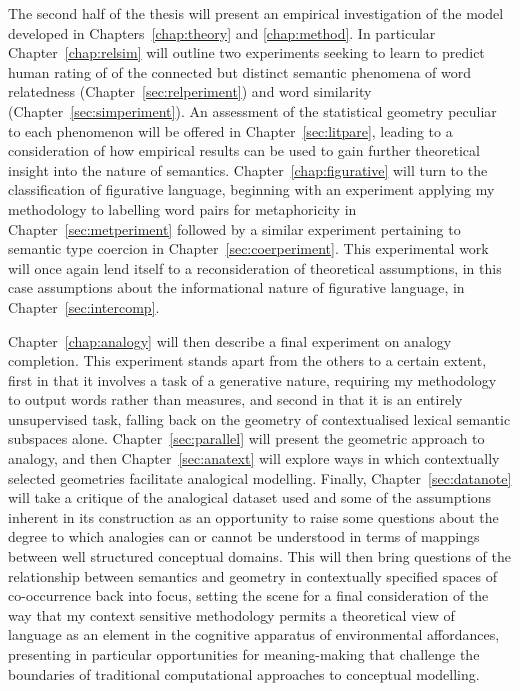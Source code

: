 The second half of the thesis will present an empirical investigation of the model developed in Chapters~\ref{chap:theory} and \ref{chap:method}.  In particular Chapter~\ref{chap:relsim} will outline two experiments seeking to learn to predict human rating of of the connected but distinct semantic phenomena of word relatedness (Chapter~\ref{sec:relperiment}) and word similarity (Chapter~\ref{sec:simperiment}).  An assessment of the statistical geometry peculiar to each phenomenon will be offered in Chapter~\ref{sec:litpare}, leading to a consideration of how empirical results can be used to gain further theoretical insight into the nature of semantics.  Chapter~\ref{chap:figurative} will turn to the classification of figurative language, beginning with an experiment applying my methodology to labelling word pairs for metaphoricity in Chapter~\ref{sec:metperiment} followed by a similar experiment pertaining to semantic type coercion in Chapter~\ref{sec:coerperiment}.  This experimental work will once again lend itself to a reconsideration of theoretical assumptions, in this case assumptions about the informational nature of figurative language, in Chapter~\ref{sec:intercomp}.

Chapter~\ref{chap:analogy} will then describe a final experiment on analogy completion.  This experiment stands apart from the others to a certain extent, first in that it involves a task of a generative nature, requiring my methodology to output words rather than measures, and second in that it is an entirely unsupervised task, falling back on the geometry of contextualised lexical semantic subspaces alone.  Chapter~\ref{sec:parallel} will present the geometric approach to analogy, and then Chapter~\ref{sec:anatext} will explore ways in which contextually selected geometries facilitate analogical modelling.  Finally, Chapter~\ref{sec:datanote} will take a critique of the analogical dataset used and some of the assumptions inherent in its construction as an opportunity to raise some questions about the degree to which analogies can or cannot be understood in terms of mappings between well structured conceptual domains.  This will then bring questions of the relationship between semantics and geometry in contextually specified spaces of co-occurrence back into focus, setting the scene for a final consideration of the way that my context sensitive methodology permits a theoretical view of language as an element in the cognitive apparatus of environmental affordances, presenting in particular opportunities for meaning-making that challenge the boundaries of traditional computational approaches to conceptual modelling.

